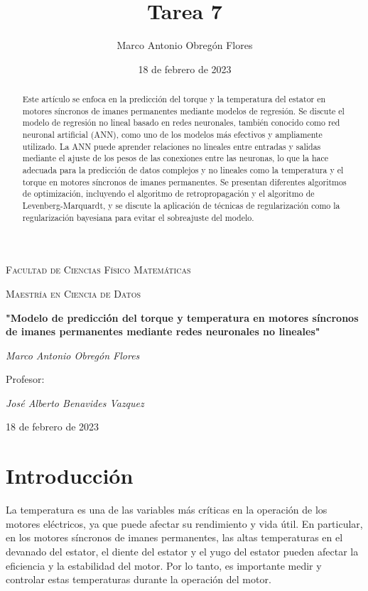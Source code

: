 \documentclass{article}
\title{Tarea 7}
\author{Marco Antonio Obregón Flores}
\date{18 de febrero de 2023}
\begin{document}
\begin{titlepage}
    \centering
    {\scshape\large Facultad de Ciencias Físico Matemáticas\par}
    {\scshape\large Maestría en Ciencia de Datos\par}
    \vspace{1cm}
    {\huge\bfseries "Modelo de predicción del torque y temperatura en motores síncronos de imanes permanentes mediante redes neuronales no lineales"\par}
    \vspace{2cm}
    {\Large\itshape Marco Antonio Obregón Flores\par}
    \vfill
    {\large Profesor:\par}
    {\Large\itshape José Alberto Benavides Vazquez\par}
    \vspace{1cm}
    {\large 18 de febrero de 2023\par}
\end{titlepage}

\begin{abstract}
Este artículo se enfoca en la predicción del torque y la temperatura del estator en motores síncronos de imanes permanentes mediante modelos de regresión. Se discute el modelo de regresión no lineal basado en redes neuronales, también conocido como red neuronal artificial (ANN), como uno de los modelos más efectivos y ampliamente utilizado. La ANN puede aprender relaciones no lineales entre entradas y salidas mediante el ajuste de los pesos de las conexiones entre las neuronas, lo que la hace adecuada para la predicción de datos complejos y no lineales como la temperatura y el torque en motores síncronos de imanes permanentes. Se presentan diferentes algoritmos de optimización, incluyendo el algoritmo de retropropagación y el algoritmo de Levenberg-Marquardt, y se discute la aplicación de técnicas de regularización como la regularización bayesiana para evitar el sobreajuste del modelo.
\end{abstract}

\section{Introducción}
\setlength{\parskip}{10pt}

La temperatura es una de las variables más críticas en la operación de los motores eléctricos, ya que puede afectar su rendimiento y vida útil. En particular, en los motores síncronos de imanes permanentes, las altas temperaturas en el devanado del estator, el diente del estator y el yugo del estator pueden afectar la eficiencia y la estabilidad del motor. Por lo tanto, es importante medir y controlar estas temperaturas durante la operación del motor.
\end{document}
